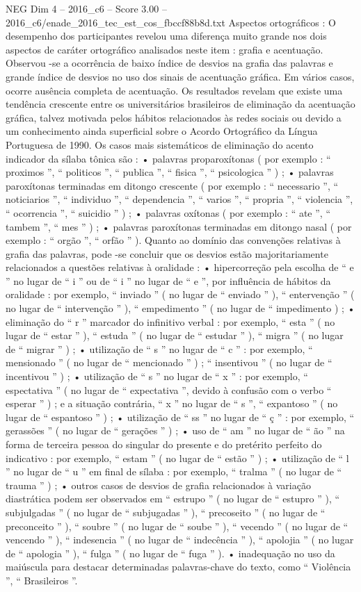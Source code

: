 \begin{textsample}{NEG Dim 4 – 2016\_c6 – Score 3.00 – 2016\_c6/enade\_2016\_tec\_est\_cos\_fbccf88b8d.txt}
Aspectos ortográficos : O desempenho dos participantes revelou uma diferença muito grande nos dois aspectos de caráter ortográfico analisados neste item : grafia e acentuação.
Observou -se a ocorrência de baixo índice de desvios na grafia das palavras e grande índice de desvios no uso dos sinais de acentuação gráfica.
Em vários casos, ocorre ausência completa de acentuação.
Os resultados revelam que existe uma tendência crescente entre os universitários brasileiros de eliminação da acentuação gráfica, talvez motivada pelos hábitos relacionados às redes sociais ou devido a um conhecimento ainda superficial sobre o Acordo Ortográfico da Língua Portuguesa de 1990.
Os casos mais sistemáticos de eliminação do acento indicador da sílaba tônica são : • palavras proparoxítonas ( por exemplo : “ proximos ”, “ politicos ”, “ publica ”, “ fisica ”, “ psicologica ” ) ; • palavras paroxítonas terminadas em ditongo crescente ( por exemplo : “ necessario ”, “ noticiarios ”, “ individuo ”, “ dependencia ”, “ varios ”, “ propria ”, “ violencia ”, “ ocorrencia ”, “ suicidio ” ) ; • palavras oxítonas ( por exemplo : “ ate ”, “ tambem ”, “ mes ” ) ; • palavras paroxítonas terminadas em ditongo nasal ( por exemplo : “ orgão ”, “ orfão ” ).
Quanto ao domínio das convenções relativas à grafia das palavras, pode -se concluir que os desvios estão majoritariamente relacionados a questões relativas à oralidade : • hipercorreção pela escolha de “ e ” no lugar de “ i ” ou de “ i ” no lugar de “ e ”, por influência de hábitos da oralidade : por exemplo, “ inviado ” ( no lugar de “ enviado ” ), “ entervenção ” ( no lugar de “ intervenção ” ), “ empedimento ” ( no lugar de “ impedimento ) ; • eliminação do “ r ” marcador do infinitivo verbal : por exemplo, “ esta ” ( no lugar de “ estar ” ), “ estuda ” ( no lugar de “ estudar ” ), “ migra ” ( no lugar de “ migrar ” ) ; • utilização de “ s ” no lugar de “ c ” : por exemplo, “ mensionado ” ( no lugar de “ mencionado ” ) ; “ insentivou ” ( no lugar de “ incentivou ” ) ; • utilização de “ s ” no lugar de “ x ” : por exemplo, “ espectativa ” ( no lugar de “ expectativa ”, devido à confusão com o verbo “ esperar ” ) ; e a situação contrária, “ x ” no lugar de “ s ”, “ expantoso ” ( no lugar de “ espantoso ” ) ; • utilização de “ ss ” no lugar de “ ç ” : por exemplo, “ gerassões ” ( no lugar de “ gerações ” ) ; • uso de “ am ” no lugar de “ ão ” na forma de terceira pessoa do singular do presente e do pretérito perfeito do indicativo : por exemplo, “ estam ” ( no lugar de “ estão ” ) ; • utilização de “ l ” no lugar de “ u ” em final de sílaba : por exemplo, “ tralma ” ( no lugar de “ trauma ” ) ; • outros casos de desvios de grafia relacionados à variação diastrática podem ser observados em “ estrupo ” ( no lugar de “ estupro ” ), “ subjulgadas ” ( no lugar de “ subjugadas ” ), “ precoseito ” ( no lugar de “ preconceito ” ), “ soubre ” ( no lugar de “ soube ” ), “ vecendo ” ( no lugar de “ vencendo ” ), “ indesencia ” ( no lugar de “ indecência ” ), “ apolojia ” ( no lugar de “ apologia ” ), “ fulga ” ( no lugar de “ fuga ” ). • inadequação no uso da maiúscula para destacar determinadas palavras-chave do texto, como “ Violência ”, “ Brasileiros ”.

\end{textsample}
